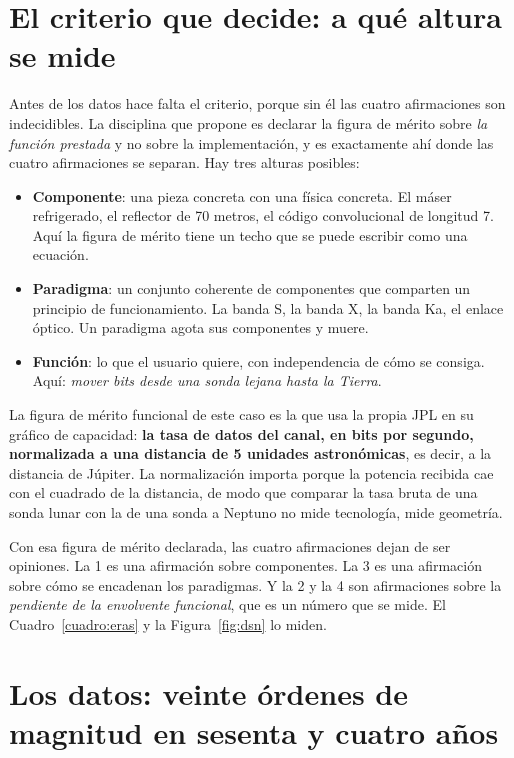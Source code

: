 \documentclass[11pt,letterpaper]{article}
\begin{document}
\section{El criterio que decide: a qué altura se mide}

Antes de los datos hace falta el criterio, porque sin él las cuatro
afirmaciones son indecidibles. La disciplina que propone \textcite{deweck2022}
es declarar la figura de mérito sobre \emph{la función prestada} y no sobre la
implementación, y es exactamente ahí donde las cuatro afirmaciones se separan.
Hay tres alturas posibles:

\begin{itemize}
\item \textbf{Componente}: una pieza concreta con una física concreta. El
  máser refrigerado, el reflector de 70 metros, el código convolucional de
  longitud 7. Aquí la figura de mérito tiene un techo que se puede escribir
  como una ecuación.
\item \textbf{Paradigma}: un conjunto coherente de componentes que comparten
  un principio de funcionamiento. La banda S, la banda X, la banda Ka, el
  enlace óptico. Un paradigma agota sus componentes y muere.
\item \textbf{Función}: lo que el usuario quiere, con independencia de cómo se
  consiga. Aquí: \emph{mover bits desde una sonda lejana hasta la Tierra}.
\end{itemize}

La figura de mérito funcional de este caso es la que usa la propia JPL en su
gráfico de capacidad: \textbf{la tasa de datos del canal, en bits por segundo,
normalizada a una distancia de 5 unidades astronómicas}, es decir, a la
distancia de Júpiter. La normalización importa porque la potencia recibida cae
con el cuadrado de la distancia, de modo que comparar la tasa bruta de una
sonda lunar con la de una sonda a Neptuno no mide tecnología, mide geometría.

Con esa figura de mérito declarada, las cuatro afirmaciones dejan de ser
opiniones. La 1 es una afirmación sobre componentes. La 3 es una afirmación
sobre cómo se encadenan los paradigmas. Y la 2 y la 4 son afirmaciones sobre
la \emph{pendiente de la envolvente funcional}, que es un número que se mide.
El Cuadro~\ref{cuadro:eras} y la Figura~\ref{fig:dsn} lo miden.

\section{Los datos: veinte órdenes de magnitud en sesenta y cuatro años}
\label{sec:datos}
\end{document}
